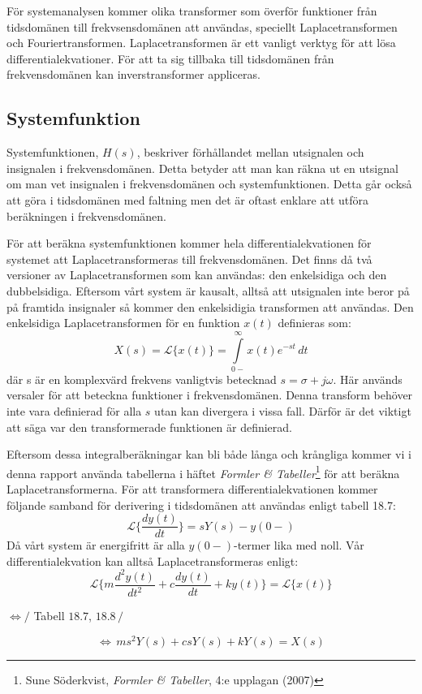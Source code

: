 För systemanalysen kommer olika transformer som överför funktioner från tidsdomänen till frekvsensdomänen att användas, speciellt Laplacetransformen och Fouriertransformen.
Laplacetransformen är ett vanligt verktyg för att lösa differentialekvationer. För att ta sig tillbaka till tidsdomänen från frekvensdomänen kan inverstransformer appliceras.

\subsection{Systemfunktion}
Systemfunktionen, $H(s)$, beskriver förhållandet mellan utsignalen och insignalen i frekvensdomänen. Detta betyder att man kan räkna ut en utsignal om man vet insignalen i frekvensdomänen och systemfunktionen. 
Detta går också att göra i tidsdomänen med faltning men det är oftast enklare att utföra beräkningen i frekvensdomänen.

För att beräkna systemfunktionen kommer hela differentialekvationen för systemet att Laplacetransformeras till frekvensdomänen. Det finns då två versioner av Laplacetransformen som kan användas: den enkelsidiga och den dubbelsidiga.
Eftersom vårt system är kausalt, alltså att utsignalen inte beror på på framtida insignaler så kommer den enkelsidigia transformen att användas.
Den enkelsidiga Laplacetransformen för en funktion $x(t)$ definieras som:
$$X(s) = \mathcal{L}\big\{x(t)\big\} = \int\limits_{0-}^{\infty} x(t)e^{-st}\,dt$$
där s är en komplexvärd frekvens vanligtvis betecknad $s=\sigma+j\omega$.
Här används versaler för att beteckna funktioner i frekvensdomänen.
Denna transform behöver inte vara definierad för alla $s$ utan kan divergera i vissa fall. Därför är det viktigt att säga var den transformerade funktionen är definierad. 

Eftersom dessa integralberäkningar kan bli både långa och krångliga kommer vi i denna rapport använda tabellerna i häftet \textit{Formler \& Tabeller}\footnote{Sune Söderkvist, \textit{Formler \& Tabeller}, 4:e upplagan (2007)} för att beräkna Laplacetransformerna.
För att transformera differentialekvationen kommer följande samband för derivering i tidsdomänen att användas enligt tabell 18.7:
$$\mathcal{L}\bigg\{\frac{dy(t)}{dt}\bigg\} = sY(s)-y(0-)$$
Då vårt system är energifritt är alla $y(0-)$-termer lika med noll. Vår differentialekvation kan alltså Laplacetransformeras enligt:
$$ \mathcal{L}\bigg\{m\displaystyle\frac{d^2y(t)}{dt^2} + c\displaystyle\frac{dy(t)}{dt} + ky(t)\bigg\}= \mathcal{L}\bigg\{x(t)\bigg\} $$
\begin{center}$ \Longleftrightarrow \bigg/$ Tabell $18.7$, $18.8\,\bigg/$ \end{center}
$$ \Longleftrightarrow\, ms^2Y(s)+csY(s)+kY(s)=X(s)$$


